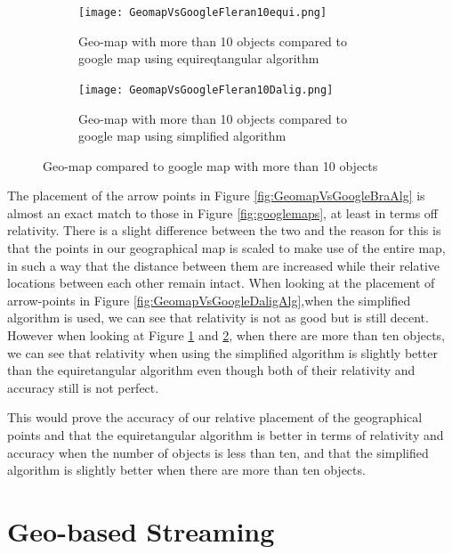 \begin{figure}
\begin{subfigure}[b]{0.5\textwidth}
       \texttt{[image: GeomapVsGoogleFleran10equi.png]}
		\caption{Geo-map with more than 10 objects compared to google map using equireqtangular algorithm}
  	\label{fig:GeomapVsGoogleFleran10equi}
    \end{subfigure}\hfill 
    \hspace{3px}
    \begin{subfigure}[b]{0.5\textwidth}
       \texttt{[image: GeomapVsGoogleFleran10Dalig.png]}
  \caption{Geo-map with more than 10 objects compared to google map using simplified algorithm}	\label{fig:GeomapVsGoogleFleran10Dalig}
    \end{subfigure}
	\caption{Geo-map compared to google map with more than 10 objects}
	\label{fig:GeomapVsGoogleWithMoreThan10objects}
\end{figure}

The placement of the arrow points in Figure \ref{fig:GeomapVsGoogleBraAlg} is almost an exact match to those in Figure \ref{fig:googlemaps}, at least in terms off relativity. There is a slight difference between the two and the reason for this is that the points in our geographical map is scaled to make use of the entire map, in such a way that the distance between them are increased while their relative locations between each other remain intact. When looking at the placement of arrow-points in Figure \ref{fig:GeomapVsGoogleDaligAlg},when the simplified algorithm is used, we can see that relativity is not as good but is still decent. However when looking at Figure \ref{fig:GeomapVsGoogleFleran10equi} and \ref{fig:GeomapVsGoogleFleran10Dalig}, when there are more than ten objects, we can see that relativity when using the simplified algorithm is slightly better than the equiretangular algorithm even though both of their relativity and accuracy still is not perfect. 

This would prove the accuracy of our relative placement of the geographical points and that the equiretangular algorithm is better in terms of relativity and accuracy when the number of objects is less than ten, and that the simplified algorithm is slightly better when there are more than ten objects.

\section{Geo-based Streaming}
\label{sec:geobasedstreaming}

